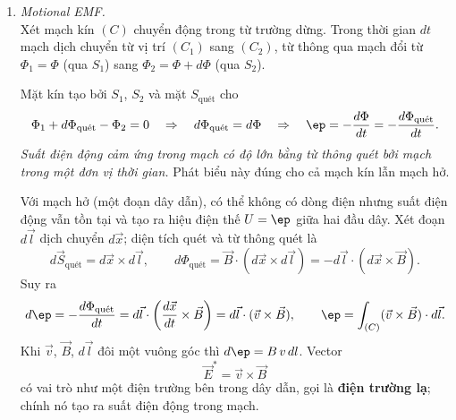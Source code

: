 \begin{enumerate}
\item \textit{Motional EMF.}\\
Xét mạch kín $(C)$ chuyển động trong từ trường dừng. Trong thời gian $dt$ mạch dịch chuyển từ vị trí $(C_1)$ sang $(C_2)$, từ thông qua mạch đổi từ $\Phi_1 = \Phi$ (qua $S_1$) sang $\Phi_2 = \Phi + d\Phi$ (qua $S_2$).
\begin{figure}[htbp]
    \centering
\end{figure}
Mặt kín tạo bởi $S_1$, $S_2$ và mặt $S_{\text{quét}}$ cho
\[
\Phi_1 + d\Phi_{\text{quét}} - \Phi_2 = 0
\quad\Rightarrow\quad
d\Phi_{\text{quét}} = d\Phi
\quad\Rightarrow\quad
\ep = -\frac{d\Phi}{dt} = -\frac{d\Phi_{\text{quét}}}{dt}.
\]
\textit{Suất điện động cảm ứng trong mạch có độ lớn bằng từ thông quét bởi mạch trong một đơn vị thời gian.} Phát biểu này đúng cho cả mạch kín lẫn mạch hở.

Với mạch hở (một đoạn dây dẫn), có thể không có dòng điện nhưng suất điện động vẫn tồn tại và tạo ra hiệu điện thế $U = \ep$ giữa hai đầu dây. Xét đoạn $d\vec{l}$ dịch chuyển $d\vec{x}$; diện tích quét và từ thông quét là
\[
d\vec{S}_{\text{quét}} = d\vec{x} \times d\vec{l},
\qquad
d\Phi_{\text{quét}} = \vec{B}\cdot(d\vec{x} \times d\vec{l}) = -d\vec{l}\cdot(d\vec{x} \times \vec{B}).
\]
Suy ra
\[
d\ep = -\frac{d\Phi_{\text{quét}}}{dt} = d\vec{l}\cdot\left(\frac{d\vec{x}}{dt} \times \vec{B}\right) = d\vec{l}\cdot(\vec{v} \times \vec{B}),
\qquad
\ep = \int_{(C)} (\vec{v} \times \vec{B})\cdot d\vec{l}.
\]
Khi $\vec{v}$, $\vec{B}$, $d\vec{l}$ đôi một vuông góc thì $d\ep = B\,v\,dl$. Vector
\[
\vec{E}^{*} = \vec{v} \times \vec{B}
\]
có vai trò như một điện trường bên trong dây dẫn, gọi là \textbf{điện trường lạ}; chính nó tạo ra suất điện động trong mạch.
\end{enumerate}

